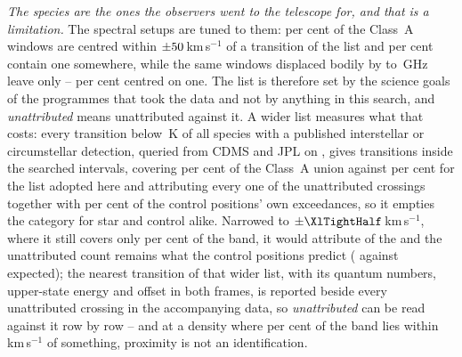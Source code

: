 \emph{The species are the ones the observers went to the telescope for, and
that is a limitation.} The spectral setups are tuned to them: \TnCenPct{} per
cent of the \NWinA{} Class~A windows are centred within
$\pm50$\,km\,s$^{-1}$ of a transition of the list and \TnWinPct{}
per cent contain one somewhere, while the same windows displaced bodily by
\TnShiftLoGHz{} to \TnShiftHiGHz\,GHz leave only
\TnCtrlCenLo--\TnCtrlCenHi{} per cent centred on one. The list is therefore
set by the science goals of the programmes that took
the data and not by anything in this search, and \emph{unattributed} means
unattributed against it. A wider list measures what that costs: every
transition below \XlEuMax\,K of all \XlNSpecies{} species with a published
interstellar or circumstellar detection, queried from CDMS and JPL
\citep{Pickett1998,CDMS2005} on \XlQueryDate, gives \XlNTrans{} transitions
inside the searched intervals, covering \XlBandPct{} per cent of the Class~A
union against \MkMaskAPct{} per cent for the list adopted here and
attributing every one of the \MkUnattr{} unattributed crossings together with
\XlShareWidePct{} per cent of the control positions' own exceedances, so it
empties the category for star and control alike. Narrowed to
$\pm\XlTightHalf$\,km\,s$^{-1}$, where it still covers only
\XlTightBandPct{} per cent of the band, it would attribute \XlTightNIn{} of
the \MkUnattr{} and the unattributed count remains what the control positions
predict (\XlTightObs{} against \XlTightExp{} expected); the nearest
transition of that wider list, with its quantum numbers, upper-state energy
and offset in both frames, is reported beside every unattributed crossing in
the accompanying data, so \emph{unattributed} can be read against it row by
row -- and at a density where \XlBandPct{} per cent of the band lies within
\MaskHalfKms\,km\,s$^{-1}$ of something, proximity is not an identification.

